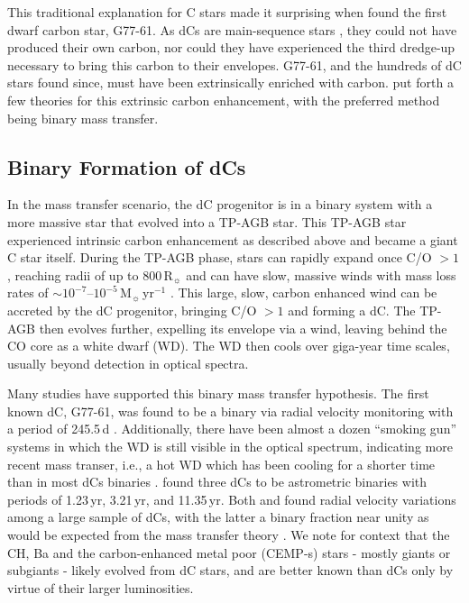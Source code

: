 \documentclass[twocolumn, tighten, times, astrosymb]{aastex631}
\begin{document}
This traditional explanation for C stars made it surprising when \citet{Dahn1977} found the first dwarf carbon star, G77-61. As dCs are main-sequence stars , they could not have produced their own carbon, nor could they have experienced the third dredge-up necessary to bring this carbon to their envelopes. G77-61, and the hundreds of dC stars found since, must have been extrinsically enriched with carbon. \citet{Dahn1977} put forth a few theories for this extrinsic carbon enhancement, with the preferred method being binary mass transfer. 

\subsection{Binary Formation of dCs}

In the mass transfer scenario, the dC progenitor is in a binary system with a more massive star that evolved into a TP-AGB star. This TP-AGB star experienced intrinsic carbon enhancement as described above and became a giant C star itself. During the TP-AGB phase, stars can rapidly expand once C/O $> 1$, reaching radii of up to $800$\,R$_\sun$ \citep{Marigo2017} and can have slow, massive winds with mass loss rates of $\sim 10^{-7}$--$10^{-5}$\,M$_\sun$\,yr$^{-1}$ \citep{Hofner2018}.  This large, slow, carbon enhanced  wind can be accreted by the dC progenitor, bringing C/O $> 1$ and forming a dC. The TP-AGB then evolves further, expelling its envelope via a wind, leaving behind the CO core as a white dwarf (WD). The WD then cools over giga-year time scales, usually beyond detection in optical spectra.

Many studies have supported this binary mass transfer hypothesis. The first known dC, G77-61, was found to be a binary via radial velocity monitoring with a period of 245.5\,d \citep{Dearborn1986}.  Additionally, there have been almost a dozen ``smoking gun'' systems in which the WD is still visible in the optical spectrum, indicating more recent mass transer, i.e., a hot WD which has been cooling for a shorter time than in most dCs binaries \citep{Heber1993, Liebert1994, Green2013, Si2014}. \citet{Harris2018} found three dCs to be astrometric binaries with periods of 1.23\,yr, 3.21\,yr, and 11.35\,yr. Both \citet{Whitehouse2018} and \citet{Roulston2019} found radial velocity variations among a large sample of dCs, with the latter  a binary fraction near unity as would be expected from the mass transfer theory \citep[95\%;][]{Roulston2019}.
We note for context that the CH, Ba and the carbon-enhanced metal poor (CEMP-s) stars \citep{Lucatello2005}
 - mostly giants or subgiants - likely evolved from dC stars, and are better known than dCs only by virtue of their larger luminosities. 
 
\end{document}
